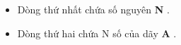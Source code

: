 \begin{itemize}
	\item     Dòng thứ nhất chứa số nguyên    \textbf{     N    }    .   
	\item     Dòng thứ hai chứa N số của dãy    \textbf{     A    }    .   
\end{itemize}